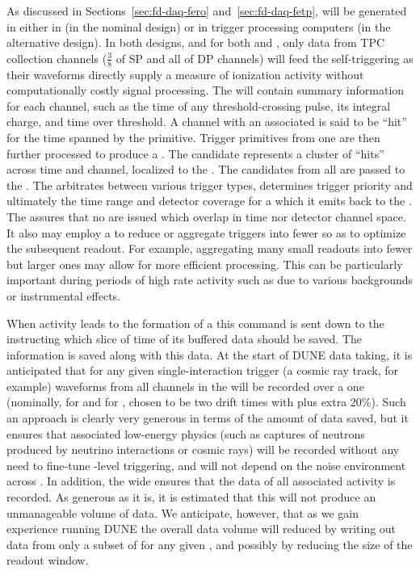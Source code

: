 As discussed in Sections~\ref{sec:fd-daq-fero}
and~\ref{sec:fd-daq-fetp},  will be generated in
either in  (in the nominal design) or in trigger
processing computers (in the alternative design). 
In both designs, and for both  and 
, only data from TPC collection channels ($\frac{3}{8}$ of SP and all of DP channels) will feed
the self-triggering as their waveforms directly supply a measure of
ionization activity without computationally costly signal processing.
The  will contain summary information for each
channel, such as the time of any threshold-crossing pulse, its
integral charge, and time over threshold. 
A channel with an associated  is said to be
``hit'' for the time spanned by the primitive. 
Trigger primitives from one  are then further processed
to produce a . 
The candidate represents a cluster of ``hits'' across time and
channel, localized to the .
The candidates from all  are passed to the
.
The  arbitrates between various trigger types, determines
trigger priority and ultimately the time range and detector coverage
for a  which it emits back to the .
The  assures that no  are issued which
overlap in time nor detector channel space.
It also may employ a  to reduce or aggregate triggers into
fewer  so as to optimize the subsequent readout. 
For example, aggregating many small readouts into fewer but larger
ones may allow for more efficient processing.   This can be particularly
important during periods of high rate activity such as due to various
backgrounds or instrumental effects.

When activity leads to the formation of a  this
command is sent down to the  instructing which slice of
time of its buffered data should be saved. 
The  information is saved along with this data. 
At the start of DUNE data taking, it is anticipated that for any given
single-interaction trigger (a cosmic ray track, for example) waveforms
from all channels in the  will be recorded over a one
 (nominally, \spreadout for  and
\dpreadout for , chosen to be two drift times with plus
extra 20\%). 
Such an approach is clearly very generous in terms of the amount of
data saved, but it ensures that associated low-energy physics (such as
captures of neutrons produced by neutrino interactions or cosmic rays)
will be recorded without any need to fine-tune -level
triggering, and will not depend on the noise environment across
. 
In addition, the wide  ensures that the data of
all associated activity is recorded.
As generous as it is, it is estimated that this 
will not produce an unmanageable volume of data. 
We anticipate, however, that as we gain experience running DUNE the
overall data volume will reduced by writing out data from only a
subset of  for any given , and possibly
by reducing the size of the readout window.

